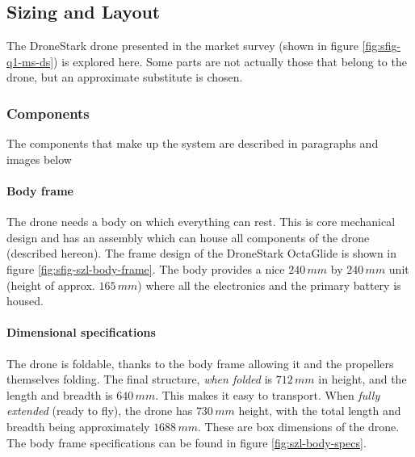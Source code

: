 \subsection{Sizing and Layout}

The DroneStark drone presented in the market survey (shown in figure \ref{fig:sfig-q1-ms-ds}) is explored here. Some parts are not actually those that belong to the drone, but an approximate substitute is chosen.

\subsubsection*{Components}

The components that make up the system are described in paragraphs and images below

\paragraph*{Body frame}
The drone needs a body on which everything can rest. This is core mechanical design and has an assembly which can house all components of the drone (described hereon). The frame design of the DroneStark OctaGlide is shown in figure \ref{fig:sfig-szl-body-frame}. The body provides a nice $240\,mm$ by $240\,mm$ unit (height of approx. $165\,mm$) where all the electronics and the primary battery is housed.

\paragraph*{Dimensional specifications}
The drone is foldable, thanks to the body frame allowing it and the propellers themselves folding. The final structure, \emph{when folded} is $712\,mm$ in height, and the length and breadth is $640\,mm$. This makes it easy to transport. When \emph{fully extended} (ready to fly), the drone has $730\,mm$ height, with the total length and breadth being approximately $1688\,mm$. These are box dimensions of the drone. The body frame specifications can be found in figure \ref{fig:szl-body-specs}.

